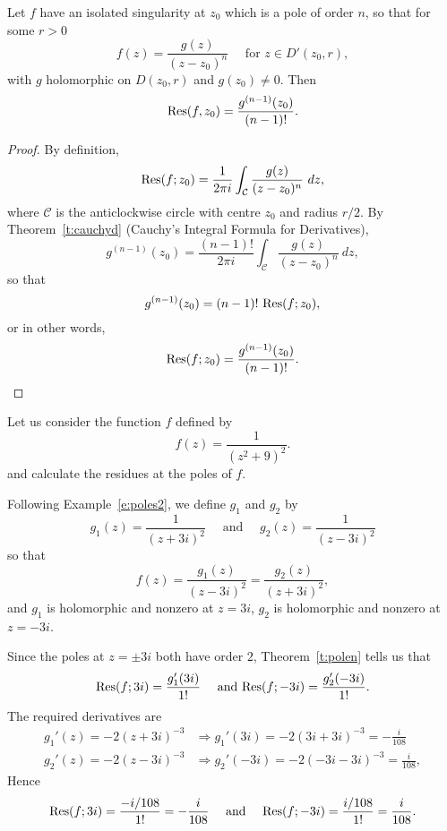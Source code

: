 \begin{theorem}
\label{t:polen}
Let $f$ have an isolated singularity at $z_0$ which is a pole of order $n$, so that for some $r>0$
\[
f(z) = \frac{g(z)}{(z-z_0)^n} \quad \text{ for } z \in D'(z_0,r),
\]
with $g$ holomorphic on $D(z_0,r)$ and $g(z_0) \neq 0$.  Then
\[
\mathrm{Res} (f,z_0) = \frac{g^{(n-1)}(z_0)}{(n-1)!}.
\]
\end{theorem}
\begin{proof}
By definition,
\[
\Res (f;z_0) = \frac{1}{2\pi i} \int_{\mathcal{C}} \frac{g(z)}{(z-z_0)^n}\ dz,
\]
where $\mathcal{C}$ is the anticlockwise circle with centre $z_0$ and radius $r/2$.  By Theorem~\ref{t:cauchyd} (Cauchy's Integral Formula for Derivatives),
\[
g^{(n-1)} (z_0) = \frac{(n-1)!}{2\pi i} \int_{\mathcal{C}} \frac{g(z)}{(z-z_0)^n}\ dz,
\]
so that
\[
g^{(n-1)} (z_0) = (n-1)!\ \mathrm{Res} (f;z_0),
\]
or in other words,
\[
\mathrm{Res} (f;z_0) = \frac{g^{(n-1)}(z_0)}{(n-1)!}.
\]
\end{proof}



\begin{example}
\label{e:res3}
Let us consider the function $f$ defined by
\[
f(z) = \frac{1}{(z^2+9)^2}.
\]
and calculate the residues at the poles of $f$.
\end{example}
\begin{solution}
Following Example~\ref{e:poles2}, we define $g_1$ and $g_2$ by
\[
g_1(z) = \frac{1}{(z+3i)^2} \quad\text{ and }\quad g_2(z) = \frac{1}{(z-3i)^2}
\]
so that
\[
f(z) = \frac{g_1(z)}{(z-3i)^2} = \frac{g_2(z)}{(z+3i)^2},
\]
and $g_1$ is holomorphic and nonzero at $z=3i$, $g_2$ is holomorphic and nonzero at $z=-3i$.  

Since the poles at $z=\pm 3i$ both have order $2$, Theorem~\ref{t:polen} tells us that
\[
\mathrm{Res} (f;3i) =\frac{g_1'(3i)}{1!} \quad\text{ and } \mathrm{Res} (f;-3i) = \frac{g_2'(-3i)}{1!}.
\]
The required derivatives are
\begin{align*}
g_1'(z) = -2(z+3i)^{-3} & \Rightarrow g_1'(3i) = -2(3i+3i)^{-3} = - \frac{i}{108} \\
g_2'(z) = -2(z-3i)^{-3} & \Rightarrow g_2'(-3i) = -2(-3i-3i)^{-3} = \frac{i}{108},
\end{align*}
Hence
\[
\mathrm{Res} (f;3i) = \frac{-i/108}{1!} = - \frac{i}{108} \quad\text{ and }\quad \mathrm{Res} (f;-3i) = \frac{i/108}{1!}= \frac{i}{108}.
\]

\end{solution}

